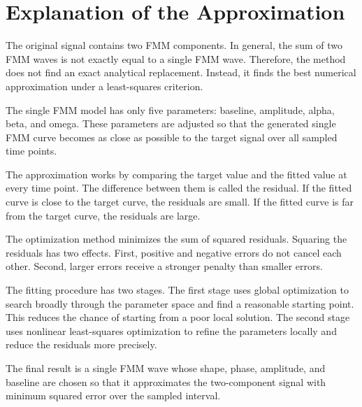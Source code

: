 \documentclass[a4paper]{article}
\begin{document}
    
    \section{Explanation of the Approximation}
        
        The original signal contains two FMM components. In general, the sum of two FMM waves is not exactly equal to a single FMM wave. Therefore, the method does not find an exact analytical replacement. Instead, it finds the best numerical approximation under a least-squares criterion.
        
        The single FMM model has only five parameters: baseline, amplitude, alpha, beta, and omega. These parameters are adjusted so that the generated single FMM curve becomes as close as possible to the target signal over all sampled time points.
        
        The approximation works by comparing the target value and the fitted value at every time point. The difference between them is called the residual. If the fitted curve is close to the target curve, the residuals are small. If the fitted curve is far from the target curve, the residuals are large.
        
        The optimization method minimizes the sum of squared residuals. Squaring the residuals has two effects. First, positive and negative errors do not cancel each other. Second, larger errors receive a stronger penalty than smaller errors.
        
        The fitting procedure has two stages. The first stage uses global optimization to search broadly through the parameter space and find a reasonable starting point. This reduces the chance of starting from a poor local solution. The second stage uses nonlinear least-squares optimization to refine the parameters locally and reduce the residuals more precisely.
        
        The final result is a single FMM wave whose shape, phase, amplitude, and baseline are chosen so that it approximates the two-component signal with minimum squared error over the sampled interval.


%        
%        
\end{document}
